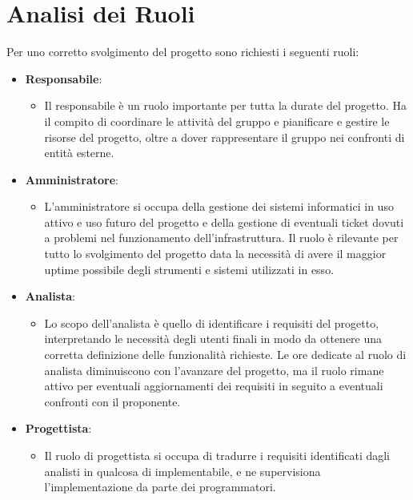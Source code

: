 \documentclass[a4paper,12pt]{article}
\begin{document}
\section{Analisi dei Ruoli}
Per uno corretto svolgimento del progetto sono richiesti i seguenti ruoli:
\begin{itemize}
    \item \textbf{Responsabile}:
        \begin{itemize}
            \item Il responsabile è un ruolo importante per tutta la durate del progetto.
            Ha il compito di coordinare le attività del gruppo e pianificare e gestire le risorse del progetto, oltre a dover rappresentare il gruppo nei confronti di entità esterne.
        \end{itemize}

    \item \textbf{Amministratore}:
        \begin{itemize}
            \item L'amministratore si occupa della gestione dei sistemi informatici in uso attivo e uso futuro del progetto e della gestione di eventuali ticket dovuti a problemi nel funzionamento dell'infrastruttura.
            Il ruolo è rilevante per tutto lo svolgimento del progetto data la necessità di avere il maggior uptime possibile degli strumenti e sistemi utilizzati in esso.
        \end{itemize}

    \item \textbf{Analista}:
        \begin{itemize}
            \item Lo scopo dell'analista è quello di identificare i requisiti del progetto, interpretando le necessità degli utenti finali in modo da ottenere una corretta definizione delle funzionalità richieste.
            Le ore dedicate al ruolo di analista diminuiscono con l'avanzare del progetto, ma il ruolo rimane attivo per eventuali aggiornamenti dei requisiti in seguito a eventuali confronti con il proponente.
        \end{itemize}

    \item \textbf{Progettista}:
        \begin{itemize}
            \item Il ruolo di progettista si occupa di tradurre i requisiti identificati dagli analisti in qualcosa di implementabile, e ne supervisiona l'implementazione da parte dei programmatori.
        \end{itemize}


\end{itemize}
\end{document}
